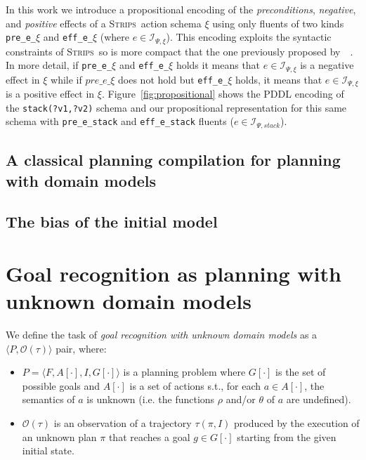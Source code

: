 \documentclass{article}
\newcommand{\tup}[1]{{\langle #1 \rangle}}
\newcommand{\strips}{\textsc{Strips}}
\begin{document}
In this work we introduce a propositional encoding of the {\em preconditions}, {\em negative}, and {\em positive} effects of a \strips\ action schema $\xi$ using only fluents of two kinds {\tt\small pre\_e\_$\xi$} and {\tt\small eff\_e\_$\xi$} (where $e\in{\mathcal I}_{\Psi,\xi}$). This encoding exploits the syntactic constraints of \strips\ so is more compact that the one previously proposed by~\citeauthor{aineto2018learning}~\citeyear{aineto2018learning}. In more detail, if {\tt\small pre\_e\_$\xi$} and {\tt\small eff\_e\_$\xi$} holds it means that $e\in{\mathcal I}_{\Psi,\xi}$ is a negative effect in $\xi$ while if $pre\_e\_\xi$ does not hold but {\tt\small eff\_e\_$\xi$} holds, it means that $e\in{\mathcal I}_{\Psi,\xi}$ is a positive effect in $\xi$. Figure~\ref{fig:propositional} shows the PDDL encoding of the {\tt\small stack(?v1,?v2)} schema and our propositional representation for this same schema with {\tt\small pre\_e\_stack} and {\tt\small eff\_e\_stack} fluents ($e\in{\mathcal I}_{\Psi,stack}$).

\subsection{A classical planning compilation for planning with domain models}


\subsection{The bias of the initial model}


\section{Goal recognition as planning with unknown domain models}
\label{sec:recognition}

We define the task of {\em goal recognition with unknown domain models} as a $\tup{P,\mathcal{O}(\tau)}$ pair, where:
\begin{itemize}
\item $P=\tup{F,A[\cdot],I,G[\cdot]}$ is a planning problem where $G[\cdot]$ is the set of possible goals and $A[\cdot]$ is a set of actions s.t., for each $a\in A[\cdot]$, the semantics of $a$ is unknown (i.e. the functions $\rho$ and/or $\theta$ of $a$ are undefined).
\item $\mathcal{O}(\tau)$ is an observation of a trajectory $\tau(\pi,I)$ produced by the execution of an unknown plan $\pi$ that reaches a goal $g\in G[\cdot]$ starting from the given initial state.
\end{itemize}
\end{document}

